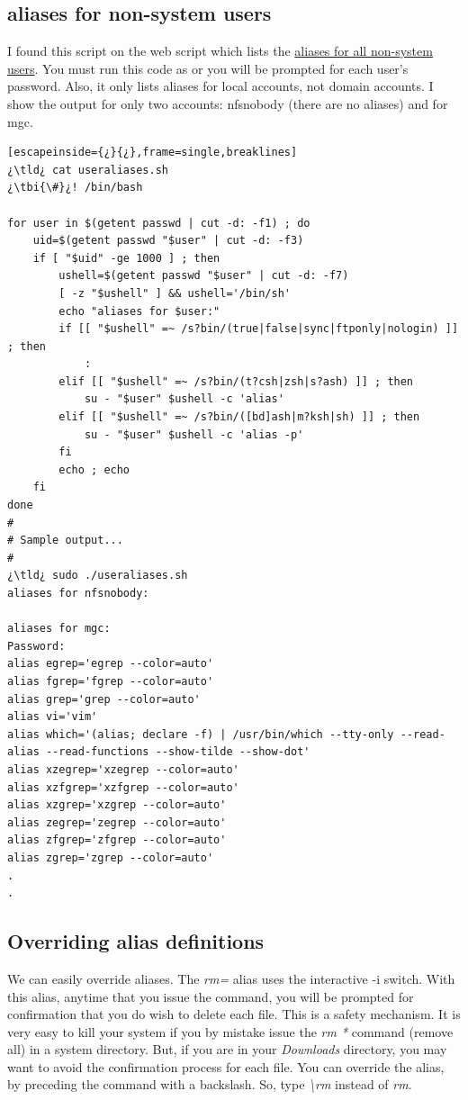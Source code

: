 \subsection{aliases for non-system users}

I found this script on the web script which lists the \href{http://unix.stackexchange.com/questions/237398/how-to-list-all-the-alias-for-all-the-user-have-on-my-linux-box-from-root}{aliases for all non-system users}. You must run this code as  or you will be prompted for each user's password. Also, it only lists aliases for local accounts, not domain accounts. I show the output for only two accounts: nfsnobody (there are no aliases) and for mgc.

\begin{lstlisting}[escapeinside={¿}{¿},frame=single,breaklines]
¿\tld¿ cat useraliases.sh 
¿\tbi{\#}¿! /bin/bash

for user in $(getent passwd | cut -d: -f1) ; do
	uid=$(getent passwd "$user" | cut -d: -f3)
	if [ "$uid" -ge 1000 ] ; then
		ushell=$(getent passwd "$user" | cut -d: -f7)
		[ -z "$ushell" ] && ushell='/bin/sh'
		echo "aliases for $user:"
		if [[ "$ushell" =~ /s?bin/(true|false|sync|ftponly|nologin) ]] ; then
			:
		elif [[ "$ushell" =~ /s?bin/(t?csh|zsh|s?ash) ]] ; then
			su - "$user" $ushell -c 'alias'
		elif [[ "$ushell" =~ /s?bin/([bd]ash|m?ksh|sh) ]] ; then 
			su - "$user" $ushell -c 'alias -p'
		fi
		echo ; echo
	fi
done
#
# Sample output...
#
¿\tld¿ sudo ./useraliases.sh
aliases for nfsnobody:

aliases for mgc:
Password: 
alias egrep='egrep --color=auto'
alias fgrep='fgrep --color=auto'
alias grep='grep --color=auto'
alias vi='vim'
alias which='(alias; declare -f) | /usr/bin/which --tty-only --read-alias --read-functions --show-tilde --show-dot'
alias xzegrep='xzegrep --color=auto'
alias xzfgrep='xzfgrep --color=auto'
alias xzgrep='xzgrep --color=auto'
alias zegrep='zegrep --color=auto'
alias zfgrep='zfgrep --color=auto'
alias zgrep='zgrep --color=auto'
.
.
\end{lstlisting}
 
\subsection{Overriding alias definitions}
 
 We can easily override aliases. The \emph{rm=}  alias uses the interactive -i switch. With this alias, anytime that you issue the  command, you will be prompted for confirmation that you do wish to delete each file. This is a safety mechanism. It is very easy to kill your system if you by mistake issue the \emph{rm *} command (remove all) in a system directory. But, if you are in your \textsl{Downloads} directory, you may want to avoid the confirmation process for each file. You can override the alias, by preceding the command with a backslash.  So, type \emph{{\textbackslash}rm} instead of \emph{rm}.
 
